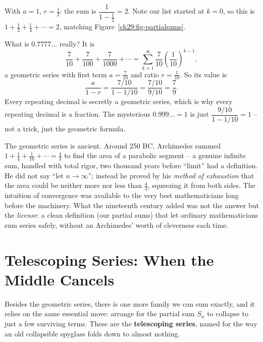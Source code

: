 \begin{example}
With $a=1$, $r=\tfrac12$: the sum is $\dfrac{1}{1 - \tfrac12} = 2$. Note our list started at $k=0$, so this is $1 + \tfrac12 + \tfrac14 + \cdots = 2$, matching Figure~\ref{ch29:fig-partialsums}.
\end{example}

\begin{example}
What is $0.7777\ldots$ really? It is
\[
\frac{7}{10} + \frac{7}{100} + \frac{7}{1000} + \cdots = \sum_{k=1}^{\infty} \frac{7}{10}\left(\frac{1}{10}\right)^{k-1},
\]
a geometric series with first term $a = \tfrac{7}{10}$ and ratio $r = \tfrac{1}{10}$. So its value is
\[
\frac{a}{1-r} = \frac{7/10}{1 - 1/10} = \frac{7/10}{9/10} = \frac{7}{9}.
\]
Every repeating decimal is secretly a geometric series, which is why every repeating decimal is a fraction. The mysterious $0.999\ldots = 1$ is just $\dfrac{9/10}{1-1/10}=1$ -- not a trick, just the geometric formula.
\end{example}

\begin{historybox}
The geometric series is ancient. Around 250 BC, Archimedes summed $1 + \tfrac14 + \tfrac{1}{16} + \cdots = \tfrac43$ to find the area of a parabolic segment -- a genuine infinite sum, handled with total rigor, two thousand years before ``limit'' had a definition. He did not say ``let $n \to \infty$''; instead he proved by his \emph{method of exhaustion} that the area could be neither more nor less than $\tfrac43$, squeezing it from both sides. The intuition of convergence was available to the very best mathematicians long before the machinery. What the nineteenth century added was not the answer but the \emph{license}: a clean definition (our partial sums) that let ordinary mathematicians sum series safely, without an Archimedes' worth of cleverness each time.
\end{historybox}

\section{Telescoping Series: When the Middle Cancels}
\label{ch29:telescoping}

Besides the geometric series, there is one more family we can sum exactly, and it relies on the same essential move: arrange for the partial sum $S_n$ to collapse to just a few surviving terms. These are the \textbf{telescoping series}, named for the way an old collapsible spyglass folds down to almost nothing.

